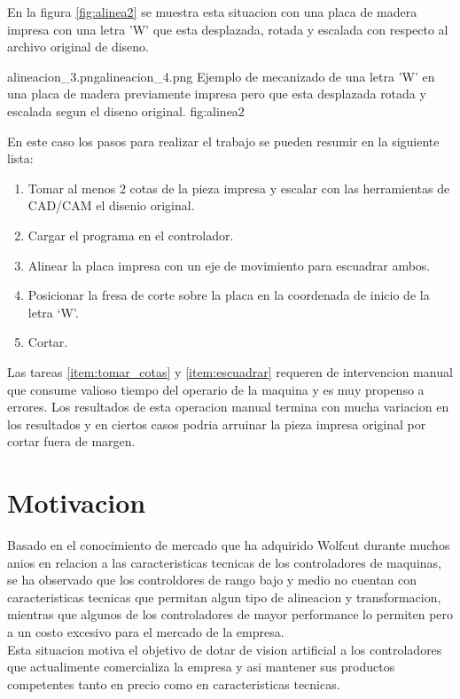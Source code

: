    En la figura \ref{fig:alinea2} se muestra esta situacion con una placa de madera impresa con una letra 'W' que esta desplazada, rotada y escalada con respecto al archivo original de diseno.

            {alineacion_3.png}{alineacion_4.png}
            {Ejemplo de mecanizado de una letra 'W' en una placa de madera previamente impresa pero que esta desplazada rotada y escalada segun el diseno original.}
            {fig:alinea2}

   En este caso los pasos para realizar el trabajo se pueden resumir en la siguiente lista:

   \begin{enumerate}
   \item{Tomar al menos 2 cotas de la pieza impresa y escalar con las herramientas de CAD/CAM el disenio original. \label{item:tomar_cotas} }
   \item{Cargar el programa en el controlador.}
   \item{Alinear la placa impresa con un eje de movimiento para escuadrar ambos.\label{item:escuadrar}}
   \item{Posicionar la fresa de corte sobre la placa en la coordenada de inicio de la letra `W'.}
   \item{Cortar.}
   \end{enumerate}

   Las tareas \ref{item:tomar_cotas} y \ref{item:escuadrar} requeren de intervencion manual que consume valioso tiempo del operario de la maquina y es muy propenso a errores. Los resultados de esta operacion manual termina con mucha variacion en los resultados y en ciertos casos podria arruinar la pieza impresa original por cortar fuera de margen.


\section{Motivacion}
   Basado en el conocimiento de mercado que ha adquirido Wolfcut durante muchos anios en relacion a las caracteristicas tecnicas de los controladores de maquinas, se ha observado que los controldores de rango bajo y medio no cuentan con caracteristicas tecnicas que permitan algun tipo de alineacion y transformacion, mientras que algunos de los controladores de mayor performance lo permiten pero a un costo excesivo para el mercado de la empresa. \\
   Esta situacion motiva el objetivo de dotar de vision artificial a los controladores que actualimente comercializa la empresa y asi mantener sus productos competentes tanto en precio como en caracteristicas tecnicas. \\


